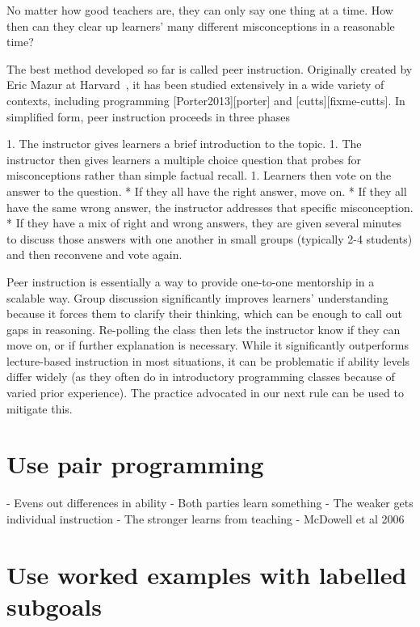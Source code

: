 \documentclass{article}
\begin{document}
No matter how good teachers are,
they can only say one thing at a time.
How then can they clear up learners' many different misconceptions
in a reasonable time?

The best method developed so far is called peer instruction.
Originally created by Eric Mazur at Harvard~\citep{mazur-peer-instruction},
it has been studied extensively in a wide variety of contexts,
including programming [Porter2013][porter] and [cutts][fixme-cutts].
In simplified form,
peer instruction proceeds in three phases

1. The instructor gives learners a brief introduction to the topic.
1. The instructor then gives learners a multiple choice question
   that probes for misconceptions rather than simple factual recall.
1. Learners then vote on the answer to the question.
   * If they all have the right answer, move on.
   * If they all have the same wrong answer,
     the instructor addresses that specific misconception.
   * If they have a mix of right and wrong answers,
     they are given several minutes to discuss those answers with one another
     in small groups (typically 2-4 students)
     and then reconvene and vote again.

Peer instruction is essentially
a way to provide one-to-one mentorship in a scalable way.
Group discussion significantly improves learners' understanding
because it forces them to clarify their thinking,
which can be enough to call out gaps in reasoning.
Re-polling the class then lets the instructor know if they can move on,
or if further explanation is necessary.
While it significantly outperforms lecture-based instruction in most situations,
it can be problematic if ability levels differ widely
(as they often do in introductory programming classes
because of varied prior experience).
The practice advocated in our next rule can be used to mitigate this.

\section{Use pair programming}

- Evens out differences in ability
- Both parties learn something
  - The weaker gets individual instruction
  - The stronger learns from teaching
- McDowell et al 2006

\section{Use worked examples with labelled subgoals}
\end{document}
